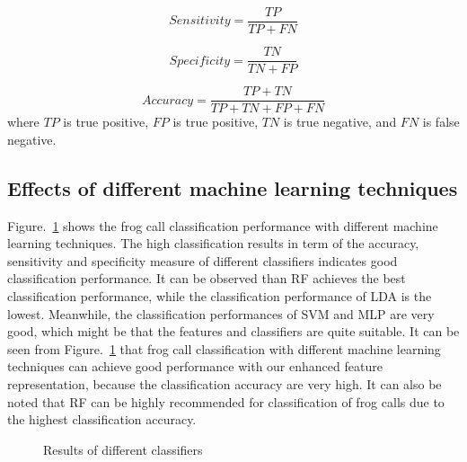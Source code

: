 \begin{equation}
Sensitivity = \frac{TP}{TP+FN}
\end{equation}

\begin{equation}
Specificity = \frac{TN}{TN+FP}
\end{equation}

\begin{equation}
Accuracy = \frac{TP+TN}{TP+TN+FP+FN}
\end{equation}
where $TP$ is true positive, $FP$ is true positive, $TN$ is true negative, and $FN$ is false negative.

\subsection{Effects of different machine learning techniques}
Figure.~\ref{diffClassifier} shows the frog call classification performance with different machine learning techniques. The high classification results in term of the accuracy, sensitivity and specificity measure of different classifiers indicates good classification performance. It can be observed than RF achieves the best classification performance, while the classification performance of LDA is the lowest. Meanwhile, the classification performances of SVM and MLP are very good, which might be that the features and classifiers are quite suitable. It can be seen from Figure.~\ref{diffClassifier} that frog call classification with different machine learning techniques can achieve good performance with our enhanced feature representation, because the classification accuracy are very high. It can also be noted that RF can be highly recommended for classification of frog calls due to the highest classification accuracy.



\begin{figure}[htb!] %
\caption{Results of different classifiers}
\label{diffClassifier} 
\end{figure}

